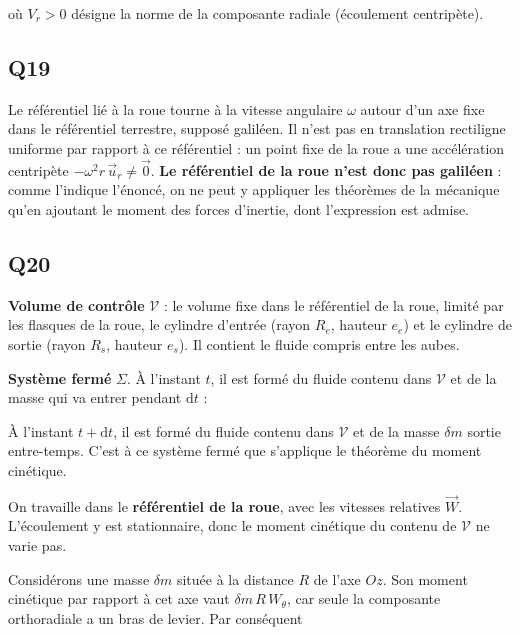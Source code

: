 \documentclass[11pt,a4paper]{article}
\newcommand{\equationajustee}[1]{%
  \sbox{\boiteequation}{$\displaystyle #1$}%
  \ifdim\wd\boiteequation>\linewidth
    \[\resizebox{\linewidth}{!}{\usebox{\boiteequation}}\]%
  \else
    \[#1\]%
  \fi}
\begin{document}
\equationajustee{\boxed{\begin{aligned}
D_v&=2\pi R_e\,e_e\,V_{r,e}\\
&=2\pi R_s\,e_s\,V_{r,s}
\end{aligned}}}

où \(V_r>0\) désigne la norme de la composante radiale (écoulement centripète).

\hypertarget{q19}{%
\subsection{Q19}\label{q19}}

Le référentiel lié à la roue tourne à la vitesse angulaire \(\omega\) autour d'un axe fixe dans le référentiel terrestre, supposé galiléen. Il n'est pas en translation rectiligne uniforme par rapport à ce référentiel : un point fixe de la roue a une accélération centripète \(-\omega^2r\,\vec u_r\neq\vec 0\). \textbf{Le référentiel de la roue n'est donc pas galiléen} : comme l'indique l'énoncé, on ne peut y appliquer les théorèmes de la mécanique qu'en ajoutant le moment des forces d'inertie, dont l'expression est admise.

\hypertarget{q20}{%
\subsection{Q20}\label{q20}}

\textbf{Volume de contrôle} \(\mathcal V\) : le volume fixe dans le référentiel de la roue, limité par les flasques de la roue, le cylindre d'entrée (rayon \(R_e\), hauteur \(e_e\)) et le cylindre de sortie (rayon \(R_s\), hauteur \(e_s\)). Il contient le fluide compris entre les aubes.

\textbf{Système fermé} \(\Sigma\). À l'instant \(t\), il est formé du fluide contenu dans \(\mathcal V\) et de la masse qui va entrer pendant \(\mathrm dt\) :

\equationajustee{\delta m=\mu_eD_v\,\mathrm dt.}

À l'instant \(t+\mathrm dt\), il est formé du fluide contenu dans \(\mathcal V\) et de la masse \(\delta m\) sortie entre-temps. C'est à ce système fermé que s'applique le théorème du moment cinétique.

On travaille dans le \textbf{référentiel de la roue}, avec les vitesses relatives \(\vec W\). L'écoulement y est stationnaire, donc le moment cinétique du contenu de \(\mathcal V\) ne varie pas.

Considérons une masse \(\delta m\) située à la distance \(R\) de l'axe \(Oz\). Son moment cinétique par rapport à cet axe vaut \(\delta m\,R\,W_\theta\), car seule la composante orthoradiale a un bras de levier. Par conséquent
\end{document}
